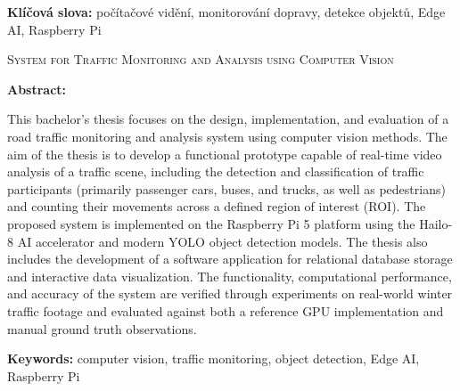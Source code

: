 \documentclass[male,czech,api_bc]{kitheses}
\newcommand{\nazeven}{System for Traffic Monitoring and Analysis using Computer Vision}
\begin{document}
\textbf{Klíčová slova:} počítačové vidění, monitorování dopravy, detekce objektů, Edge AI, Raspberry Pi

\bigskip

\textsc{\nazeven}

\textbf{Abstract:}


This bachelor's thesis focuses on the design, implementation, and evaluation of a road traffic monitoring and analysis system using computer vision methods. The aim of the thesis is to develop a functional prototype capable of real-time video analysis of a traffic scene, including the detection and classification of traffic participants (primarily passenger cars, buses, and trucks, as well as pedestrians) and counting their movements across a defined region of interest (ROI). The proposed system is implemented on the Raspberry Pi 5 platform using the Hailo-8 AI accelerator and modern YOLO object detection models. The thesis also includes the development of a software application for relational database storage and interactive data visualization. The functionality, computational performance, and accuracy of the system are verified through experiments on real-world winter traffic footage and evaluated against both a reference GPU implementation and manual ground truth observations.

\textbf{Keywords:} computer vision, traffic monitoring, object detection, Edge AI, Raspberry Pi

\tableofcontents

\clearpage

\end{document}
